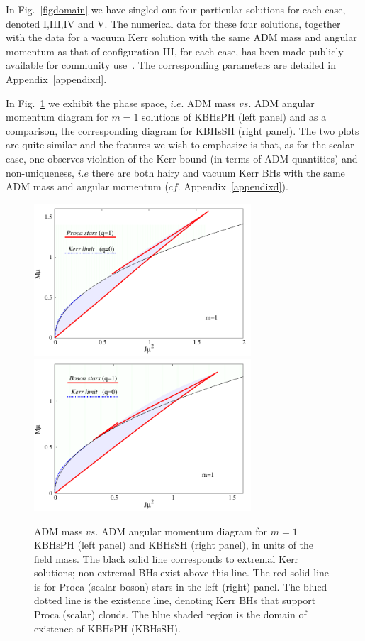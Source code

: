 In Fig.~\ref{figdomain} we have singled out four particular solutions for each case, denoted I,III,IV and V. The numerical data for these four solutions, together with the data for a vacuum Kerr solution with the same ADM mass and angular momentum as that of configuration III, for each case, has been made publicly available for community use~\cite{datakbhph,datakbhsh}. The corresponding parameters are detailed in Appendix~\ref{appendixd}.

In Fig.~\ref{fig2} we exhibit the phase space, $i.e.$ ADM mass $vs.$ ADM angular momentum diagram for $m=1$ solutions of KBHsPH (left panel) and as a comparison, the corresponding diagram for KBHsSH (right panel). The two plots are quite similar and the features we wish to emphasize is that, as for the scalar case, one observes violation of the Kerr bound (in terms of ADM quantities) and non-uniqueness, $i.e$ there are both hairy and vacuum Kerr BHs with the same ADM mass and angular momentum ($cf.$ Appendix~\ref{appendixd}). 


%
\begin{figure}[h!]
  \begin{center}
    \includegraphics[width=8.1cm]{papers/Proca/BH-J-M.pdf}
      \includegraphics[width=8.1cm]{papers/Proca/scalar-BH-J-M.pdf}
  \end{center}
  \caption{ADM mass $vs.$ ADM angular momentum diagram for $m=1$ KBHsPH (left panel) and KBHsSH (right panel), in units of the field mass. The black solid line corresponds to extremal Kerr solutions; non extremal BHs exist above this line. The red solid line is for Proca (scalar boson) stars in the left (right) panel. The blued dotted line is the existence line, denoting Kerr BHs that support Proca (scalar) clouds. The blue shaded region is the domain of existence of KBHsPH (KBHsSH).}
  \label{fig2}
\end{figure}
 

